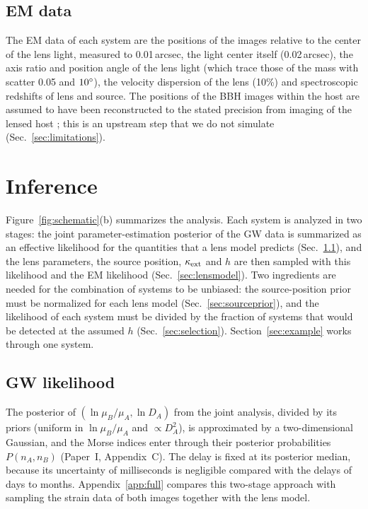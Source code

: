\subsection{EM data}
\label{sec:emdata}
The EM data of each system are the positions of the images relative to the center of the lens light, measured to 0.01\,arcsec, the light center itself (0.02\,arcsec), the axis ratio and position angle of the lens light (which trace those of the mass with scatter 0.05 and $10^\circ$), the velocity dispersion of the lens (10\%) and spectroscopic redshifts of lens and source. The positions of the BBH images within the host are assumed to have been reconstructed to the stated precision from imaging of the lensed host \citep{hannuksela2020localizing,wempe2022lensing,uronen2026silmarel}; this is an upstream step that we do not simulate (Sec.~\ref{sec:limitations}).

\section{Inference}
\label{sec:inference}
Figure~\ref{fig:schematic}(b) summarizes the analysis. Each system is analyzed in two stages: the joint parameter-estimation posterior of the GW data is summarized as an effective likelihood for the quantities that a lens model predicts (Sec.~\ref{sec:gwlike}), and the lens parameters, the source position, $\kappa_{\rm ext}$ and $h$ are then sampled with this likelihood and the EM likelihood (Sec.~\ref{sec:lensmodel}). Two ingredients are needed for the combination of systems to be unbiased: the source-position prior must be normalized for each lens model (Sec.~\ref{sec:sourceprior}), and the likelihood of each system must be divided by the fraction of systems that would be detected at the assumed $h$ (Sec.~\ref{sec:selection}). Section~\ref{sec:example} works through one system.

\subsection{GW likelihood}
\label{sec:gwlike}
The posterior of $(\ln\mu_B/\mu_A,\ln D_A)$ from the joint analysis, divided by its priors (uniform in $\ln\mu_B/\mu_A$ and $\propto D_A^2$), is approximated by a two-dimensional Gaussian, and the Morse indices enter through their posterior probabilities $P(n_A,n_B)$ (Paper~I, Appendix~C). The delay is fixed at its posterior median, because its uncertainty of milliseconds is negligible compared with the delays of days to months. Appendix~\ref{app:full} compares this two-stage approach with sampling the strain data of both images together with the lens model.

